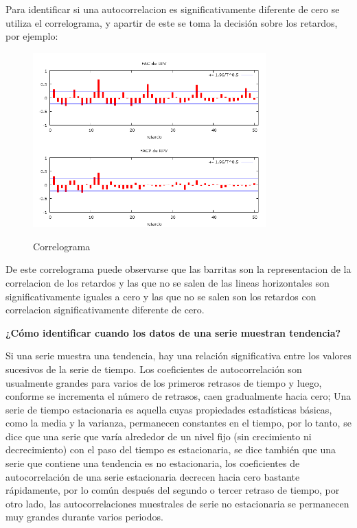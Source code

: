 \documentclass[12pt,letterpaper]{report}
\begin{document}
Para identificar si una autocorrelacion es significativamente diferente de cero se utiliza el correlograma, y apartir de este se toma la decisión sobre los retardos, por ejemplo:

\begin{figure}[htb]

\centering
\caption{Correlograma} 
\includegraphics [width=0.8\textwidth]{LOL2}
\label{correlograma1}
\end{figure}

De este correlograma puede observarse que las barritas son la representacion de la correlacion de los retardos y las que no se salen de las lineas horizontales son significativamente iguales a cero y las que no se salen son los retardos con correlacion significativamente diferente de cero.

\textbf{¿Cómo identificar cuando los datos de una serie muestran tendencia?}

Si una serie muestra una tendencia, hay una relación significativa entre los
valores sucesivos de la serie de tiempo. Los coeficientes de autocorrelación son
usualmente grandes para varios de los primeros retrasos de tiempo y luego,
conforme se incrementa el número de retrasos, caen gradualmente hacia cero; 
Una serie de tiempo estacionaria es aquella cuyas propiedades estadísticas
básicas, como la media y la varianza, permanecen constantes en el tiempo,
por lo tanto, se dice que una serie que varía alrededor de un nivel fijo (sin
crecimiento ni decrecimiento) con el paso del tiempo es estacionaria, se dice
también que una serie que contiene una tendencia es no estacionaria, los
coeficientes de autocorrelación de una serie estacionaria decrecen hacia cero
bastante rápidamente, por lo común después del segundo o tercer retraso
de tiempo, por otro lado, las autocorrelaciones muestrales de serie no estacionaria se permanecen muy grandes durante varios periodos.
\end{document}
